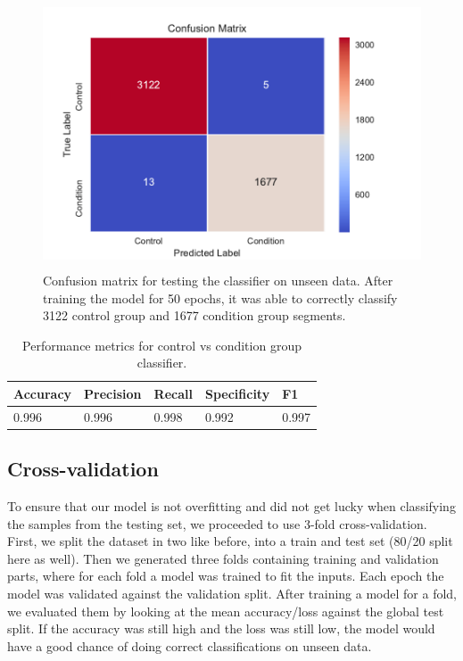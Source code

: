 \begin{figure}
\begin{center}
      \includegraphics[height=8cm]{img/control_condition/50ep.pdf}
      \caption{Confusion matrix for testing the classifier on unseen data. After training the model for 50 epochs, it was able to correctly classify 3122 control group and 1677 condition group segments.}
      \label{figure:control_condition_confusion_matrix_48h}
\end{center}
\end{figure}


\begin{table}[h]
\begin{center}
      \begin{tabular}{|l|l|l|l|l|}
            \hline
            \bfseries Accuracy & \bfseries Precision & \bfseries Recall & \bfseries Specificity & \bfseries F1 \\\hline
            0.996 & 0.996 & 0.998 & 0.992 & 0.997 \\\hline
      \end{tabular}
      \caption{Performance metrics for control vs condition group classifier.}
      \label{table:control_condition_performance}
\end{center}
\end{table}

\vfill

\subsection{Cross-validation}

To ensure that our model is not overfitting and did not get lucky when classifying the samples from the testing set, we proceeded to use 3-fold cross-validation. First, we split the dataset in two like before, into a train and test set (80/20 split here as well). Then we generated three folds containing training and validation parts, where for each fold a model was trained to fit the inputs. Each epoch the model was validated against the validation split. After training a model for a fold, we evaluated them by looking at the mean accuracy/loss against the global test split. If the accuracy was still high and the loss was still low, the model would have a good chance of doing correct classifications on unseen data.

